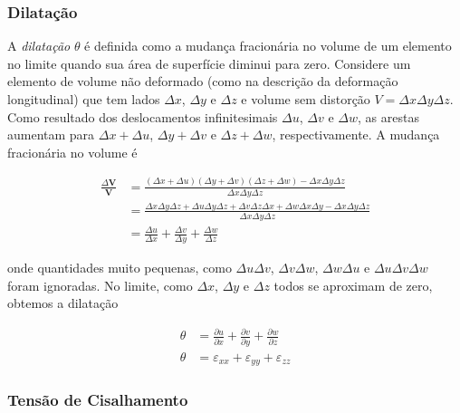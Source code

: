 \documentclass[]{book}
\theoremstyle{definition}
\theoremstyle{definition}
\theoremstyle{definition}
\theoremstyle{remark}
\begin{document}
\hypertarget{dilatacao}{%
\subsubsection{Dilatação}\label{dilatacao}}

A \emph{dilatação} \(\theta\) é definida como a mudança fracionária no volume de um elemento no limite quando sua área de superfície diminui para zero. Considere um elemento de volume não deformado (como na descrição da deformação longitudinal) que tem lados \(\Delta x\), \(\Delta y\) e \(\Delta z\) e volume sem distorção \(V= \Delta x \Delta y \Delta z\). Como resultado dos deslocamentos infinitesimais \(\Delta u\), \(\Delta v\) e \(\Delta w\), as arestas aumentam para \(\Delta x + \Delta u\), \(\Delta y + \Delta v\) e \(\Delta z + \Delta w\), respectivamente. A mudança fracionária no volume é

\begin{align}
\frac{\Delta{\mathbf {V}}}{\mathbf{V}} & = \frac {(\Delta {x} + \Delta{u})(\Delta{y} + \Delta{v})(\Delta{z} + \Delta{w}) - \Delta{x} \Delta{y} \Delta{z}}{\Delta{x} \Delta{y} \Delta{z}} \nonumber\\
& = \frac {\Delta{x} \Delta{y} \Delta{z} + \Delta{u} \Delta{y} \Delta{z} + \Delta{v} \Delta{z} \Delta{x} + \Delta{w} \Delta{x} \Delta{y} - \Delta{x} \Delta{y} \Delta{z}}{\Delta{x} \Delta{y} \Delta{z}} \nonumber \\
&=\frac {\Delta {u}}{\Delta{x}} + \frac {\Delta {v}}{\Delta{y}} + \frac {\Delta {w}}{\Delta {z}}
\label{eq:0307}
\end{align}

onde quantidades muito pequenas, como \(\Delta u\Delta v\), \(\Delta v\Delta w\), \(\Delta w\Delta u\) e \(\Delta u\Delta v\Delta w\) foram ignoradas. No limite, como \(\Delta x\), \(\Delta y\) e \(\Delta z\) todos se aproximam de zero, obtemos a dilatação

\begin{align}
\theta &= \frac{\partial u}{\partial x} + \frac{\partial v}{\partial y} + \frac{\partial w}{\partial z} \nonumber\\
\theta &= \varepsilon_{xx} + \varepsilon_{yy} + \varepsilon_{zz}
\label{eq:0308}
\end{align}

\hypertarget{tensao-de-cisalhamento}{%
\subsubsection{Tensão de Cisalhamento}\label{tensao-de-cisalhamento}}
\end{document}
